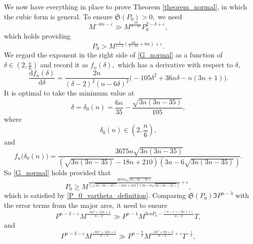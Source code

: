 \documentclass[12pt]{amsart}
\theoremstyle{definition}
\numberwithin{equation}{section}
\begin{document}
We now have everything in place to prove Theorem \ref{theorem_normal}, in which the cubic form is general. 
To ensure $\mathfrak{S}(P_0) > 0,$ we need
\begin{equation*}
     M^{-6n-\varepsilon} \gg M^{\frac{n\delta}{n-6\delta}}P_0^{2-\delta+\varepsilon},
\end{equation*}
which holds providing
\begin{equation}
    \label{G_normal}
    P_0 > M^{\frac{1}{\delta-2}\left(\frac{n\delta}{n-6\delta}+6n\right)+\varepsilon}.
\end{equation}
We regard the exponent in the right side of \eqref{G_normal} as a function of $\delta \in \left(2, \frac{n}{6}\right)$ and record it as $f_n(\delta),$ which has a derivative with respect to $\delta,$ 
\begin{equation*}
    \frac{\mathrm{d} f_n(\delta)}{\mathrm{d} \delta}=\frac{2n}{(\delta-2)^2(n-6\delta)^2}\bigg(-105\delta^2+36n\delta-n(3n+1)\bigg).
\end{equation*}
It is optimal to take the minimum value at
\begin{equation*}
    \delta=\delta_0(n) =\frac{6n}{35}-\frac{\sqrt{3n(3n-35)}}{105},
\end{equation*}
where
\begin{equation*}
    \delta_0(n) \in \left(2, \frac{n}{6}\right),
\end{equation*}
and
\begin{equation}  
\label{f_n_extremum}
f_n\big(\delta_0(n)\big)=\frac{3675n\sqrt{3n(3n-35)}}{(\sqrt{3n(3n-35)}-18n+210)(3n-6\sqrt{3n(3n-35)})}. 
\end{equation}
So \eqref{G_normal} holds provided that
\begin{equation}
    \label{P_0_another_requirment}
    P_{0} \geq M^{\frac{3675n\sqrt{3n(3n-35)}}{(\sqrt{3n(3n-35)}-18n+210)(3n-6\sqrt{3n(3n-35)})}+\varepsilon},
\end{equation}
which is satisfied by \eqref{P_0_vartheta_definition}.
Comparing $\mathfrak{S}(P_0)\mathfrak{I}P^{n-3}$ with the error terms from the major arcs, it need to ensure  
\begin{equation*}
    P^{n-3-\varepsilon}M^{\frac{-8n^2+12n+1}{n-2}} \gg P^{n-1}M^{3eoP_0-\frac{(n-1)(2n+1)}{n-2}}T,
\end{equation*}
and
\begin{equation*}
    P^{n-3-\varepsilon}M^{\frac{-8n^2+12n+1}{n-2}} \gg P^{n-\frac{9}{2}}M^{\frac{-2n^2+8n+3}{n-2}+\varepsilon}T^{-\frac{1}{2}},
\end{equation*}
\end{document}
